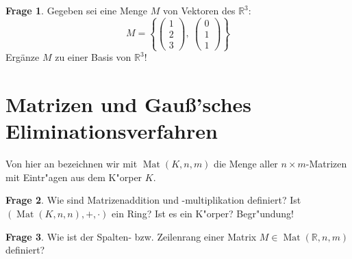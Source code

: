 \documentclass{scrartcl}
\theoremstyle{definition}
\newtheorem{frage}{Frage}[section]
\newcommand{\R}{\mathbb R}
\DeclareMathOperator{\Mat}{Mat}
\begin{document}
\begin{frage}
Gegeben sei eine Menge $M$ von Vektoren des $\R^3$:
\[
    M = \left\{ 
        \begin{pmatrix} 1 \\ 2 \\ 3 \end{pmatrix}, \:
        \begin{pmatrix} 0 \\ 1 \\ 1 \end{pmatrix}
    \right\}
\]
Ergänze $M$ zu einer Basis von $\R^3$!
\end{frage}

\section {Matrizen und Gauß'sches Eliminationsverfahren}

Von hier an bezeichnen wir mit $\Mat(K, n, m)$ die Menge aller
$n \times m$-Matrizen mit Eintr"agen aus dem K"orper $K$.

\begin{frage}
Wie sind Matrizenaddition und -multiplikation definiert? Ist
$(\Mat(K, n, n), +, \cdot)$ ein Ring? Ist es ein K"orper? Begr"undung!
\end{frage}

\begin{frage}
Wie ist der Spalten- bzw. Zeilenrang einer Matrix $M \in \Mat(\R, n, m)$
definiert?
\end{frage}
\end{document}
